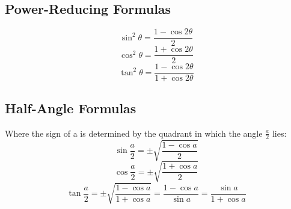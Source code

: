 \documentclass{article}
\begin{document}
\subsection{Power-Reducing Formulas}
\[\sin^2{\theta}=\frac{1-\cos{2\theta}}{2}\]
\[\cos^2{\theta}=\frac{1+\cos{2\theta}}{2}\]
\[\tan^2{\theta}=\frac{1-\cos{2\theta}}{1+\cos{2\theta}}\]

\subsection{Half-Angle Formulas}
Where the sign of a is determined by the quadrant in which the angle
$\frac{a}{2}$ lies:
\[\sin{\frac{a}{2}}=\pm\sqrt{\frac{1-\cos{a}}{2}}\]
\[\cos{\frac{a}{2}}=\pm\sqrt{\frac{1+\cos{a}}{2}}\]
\[\tan{\frac{a}{2}}=\pm\sqrt{\frac{1-\cos{a}}{1+\cos{a}}}=\frac{1-\cos{a}}{\sin{a}}=\frac{\sin{a}}{1+\cos{a}}\]
\end{document}

